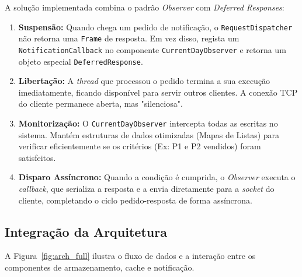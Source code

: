 \documentclass{article}
\begin{document}
A solução implementada combina o padrão \textit{Observer} com \textit{Deferred Responses}:
\begin{enumerate}
    \item \textbf{Suspensão:} Quando chega um pedido de notificação, o \texttt{RequestDispatcher} não retorna uma \texttt{Frame} de resposta. Em vez disso, regista um \texttt{NotificationCallback} no componente \texttt{CurrentDayObserver} e retorna um objeto especial \texttt{DeferredResponse}.
    \item \textbf{Libertação:} A \textit{thread} que processou o pedido termina a sua execução imediatamente, ficando disponível para servir outros clientes. A conexão TCP do cliente permanece aberta, mas "silenciosa".
    \item \textbf{Monitorização:} O \texttt{CurrentDayObserver} intercepta todas as escritas no sistema. Mantém estruturas de dados otimizadas (Mapas de Listas) para verificar eficientemente se os critérios (Ex: P1 e P2 vendidos) foram satisfeitos.
    \item \textbf{Disparo Assíncrono:} Quando a condição é cumprida, o \textit{Observer} executa o \textit{callback}, que serializa a resposta e a envia diretamente para a \textit{socket} do cliente, completando o ciclo pedido-resposta de forma assíncrona.
\end{enumerate}

\subsection{Integração da Arquitetura}

A Figura~\ref{fig:arch_full} ilustra o fluxo de dados e a interação entre os componentes de armazenamento, cache e notificação.
\end{document}
